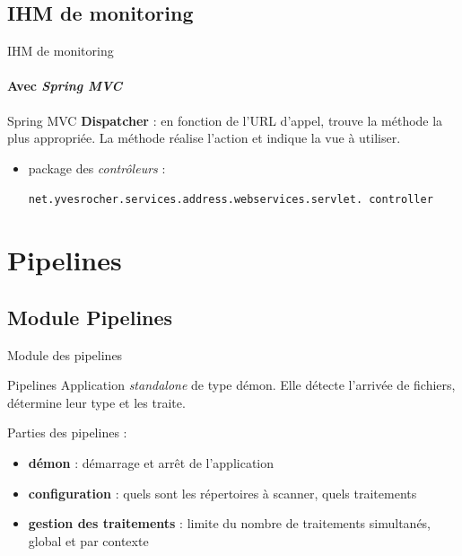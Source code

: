 \documentclass[compact]{beamer}%
\begin{document}
\subsection{IHM de monitoring}

\begin{frame}{IHM de monitoring}
	\framesubtitle{Avec \emph{Spring MVC}}
	
	\begin{block}{Spring MVC}
	\textbf{Dispatcher} : en fonction de l'URL d'appel, trouve la méthode la plus appropriée. La méthode réalise l'action et indique la vue à utiliser.	
	\end{block}
	
	\pause
	\begin{itemize}
	\item package des \emph{contrôleurs} :\par
	\texttt{net.yvesrocher.services.address.webservices.servlet. controller}
	\end{itemize}

\end{frame}


\section{Pipelines}

\subsection{Module Pipelines}

\begin{frame}{Module des pipelines}

	\begin{block}{Pipelines}
	Application \emph{standalone} de type démon. Elle détecte l'arrivée de fichiers, détermine leur type et les traite.
	\end{block}
	
	\pause
	Parties des pipelines :
	\begin{itemize}[<+->]
	\item \textbf{démon} : démarrage et arrêt de l'application
	\item \textbf{configuration} : quels sont les répertoires à scanner, quels traitements
	\item \textbf{gestion des traitements} : limite du nombre de traitements simultanés, global et par contexte
	\end{itemize}

\end{frame}
\end{document}
